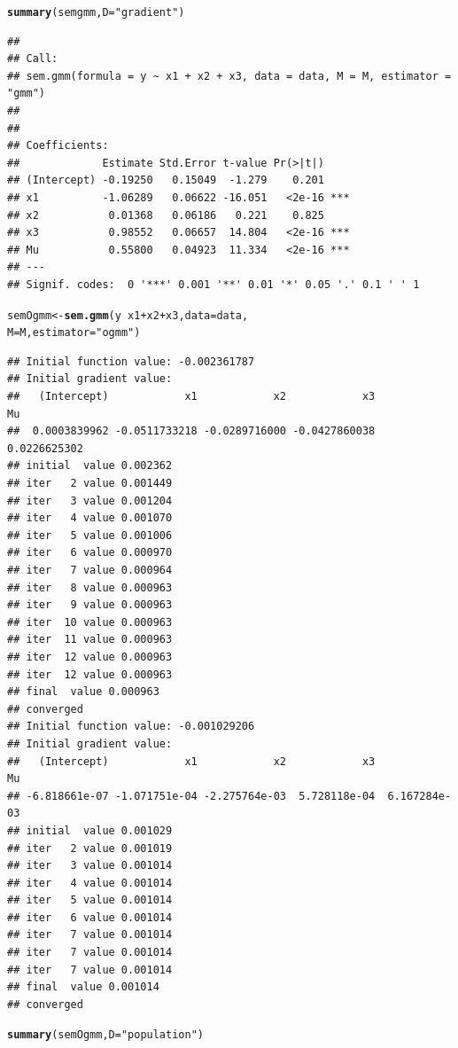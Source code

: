 \documentclass[english,12pt]{book}\usepackage[]{graphicx}\usepackage[]{xcolor}
\makeatletter
\newcommand{\hlstr}[1]{\textcolor[rgb]{0.192,0.494,0.8}{#1}}%
\newcommand{\hlopt}[1]{\textcolor[rgb]{0,0,0}{#1}}%
\newcommand{\hlstd}[1]{\textcolor[rgb]{0.345,0.345,0.345}{#1}}%
\newcommand{\hlkwb}[1]{\textcolor[rgb]{0.69,0.353,0.396}{#1}}%
\newcommand{\hlkwc}[1]{\textcolor[rgb]{0.333,0.667,0.333}{#1}}%
\newcommand{\hlkwd}[1]{\textcolor[rgb]{0.737,0.353,0.396}{\textbf{#1}}}%
\newenvironment{kframe}{%
 \def\at@end@of@kframe{}%
 \ifinner\ifhmode%
  \def\at@end@of@kframe{\end{minipage}}%
  \begin{minipage}{\columnwidth}%
 \fi\fi%
 \def\FrameCommand##1{\hskip\@totalleftmargin \hskip-\fboxsep
 \colorbox{shadecolor}{##1}\hskip-\fboxsep
     \hskip-\linewidth \hskip-\@totalleftmargin \hskip\columnwidth}%
 \MakeFramed {\advance\hsize-\width
   \@totalleftmargin\z@ \linewidth\hsize
   \@setminipage}}%
 {\par\unskip\endMakeFramed%
 \at@end@of@kframe}
\newenvironment{knitrout}{}{} %
\makeatother
\begin{document}
\begin{knitrout}
\begin{kframe}
\begin{alltt}
\hlkwd{summary}\hlstd{(semgmm,} \hlkwc{D} \hlstd{=} \hlstr{"gradient"}\hlstd{)}
\end{alltt}
\begin{verbatim}
## 
## Call:
## sem.gmm(formula = y ~ x1 + x2 + x3, data = data, M = M, estimator = "gmm")
## 
## 
## Coefficients:
##             Estimate Std.Error t-value Pr(>|t|)    
## (Intercept) -0.19250   0.15049  -1.279    0.201    
## x1          -1.06289   0.06622 -16.051   <2e-16 ***
## x2           0.01368   0.06186   0.221    0.825    
## x3           0.98552   0.06657  14.804   <2e-16 ***
## Mu           0.55800   0.04923  11.334   <2e-16 ***
## ---
## Signif. codes:  0 '***' 0.001 '**' 0.01 '*' 0.05 '.' 0.1 ' ' 1
\end{verbatim}
\begin{alltt}
\hlstd{semOgmm} \hlkwb{<-} \hlkwd{sem.gmm}\hlstd{(y} \hlopt{~} \hlstd{x1} \hlopt{+} \hlstd{x2} \hlopt{+} \hlstd{x3,} \hlkwc{data} \hlstd{= data,}
                  \hlkwc{M} \hlstd{= M,} \hlkwc{estimator} \hlstd{=} \hlstr{"ogmm"}\hlstd{)}
\end{alltt}
\begin{verbatim}
## Initial function value: -0.002361787 
## Initial gradient value:
##   (Intercept)            x1            x2            x3            Mu 
##  0.0003839962 -0.0511733218 -0.0289716000 -0.0427860038  0.0226625302 
## initial  value 0.002362 
## iter   2 value 0.001449
## iter   3 value 0.001204
## iter   4 value 0.001070
## iter   5 value 0.001006
## iter   6 value 0.000970
## iter   7 value 0.000964
## iter   8 value 0.000963
## iter   9 value 0.000963
## iter  10 value 0.000963
## iter  11 value 0.000963
## iter  12 value 0.000963
## iter  12 value 0.000963
## final  value 0.000963 
## converged
## Initial function value: -0.001029206 
## Initial gradient value:
##   (Intercept)            x1            x2            x3            Mu 
## -6.818661e-07 -1.071751e-04 -2.275764e-03  5.728118e-04  6.167284e-03 
## initial  value 0.001029 
## iter   2 value 0.001019
## iter   3 value 0.001014
## iter   4 value 0.001014
## iter   5 value 0.001014
## iter   6 value 0.001014
## iter   7 value 0.001014
## iter   7 value 0.001014
## iter   7 value 0.001014
## final  value 0.001014 
## converged
\end{verbatim}
\begin{alltt}
\hlkwd{summary}\hlstd{(semOgmm,} \hlkwc{D} \hlstd{=} \hlstr{"population"}\hlstd{)}
\end{alltt}
\begin{verbatim}

\end{verbatim}
\end{kframe}
\end{knitrout}
\end{document}
